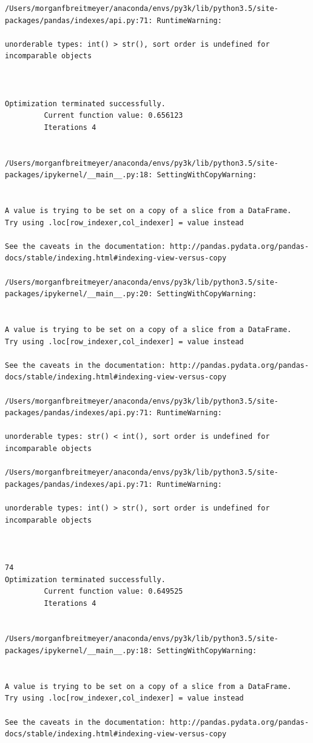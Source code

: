 \begin{lstlisting}
/Users/morganfbreitmeyer/anaconda/envs/py3k/lib/python3.5/site-packages/pandas/indexes/api.py:71: RuntimeWarning:

unorderable types: int() > str(), sort order is undefined for incomparable objects



Optimization terminated successfully.
         Current function value: 0.656123
         Iterations 4


/Users/morganfbreitmeyer/anaconda/envs/py3k/lib/python3.5/site-packages/ipykernel/__main__.py:18: SettingWithCopyWarning:


A value is trying to be set on a copy of a slice from a DataFrame.
Try using .loc[row_indexer,col_indexer] = value instead

See the caveats in the documentation: http://pandas.pydata.org/pandas-docs/stable/indexing.html#indexing-view-versus-copy

/Users/morganfbreitmeyer/anaconda/envs/py3k/lib/python3.5/site-packages/ipykernel/__main__.py:20: SettingWithCopyWarning:


A value is trying to be set on a copy of a slice from a DataFrame.
Try using .loc[row_indexer,col_indexer] = value instead

See the caveats in the documentation: http://pandas.pydata.org/pandas-docs/stable/indexing.html#indexing-view-versus-copy

/Users/morganfbreitmeyer/anaconda/envs/py3k/lib/python3.5/site-packages/pandas/indexes/api.py:71: RuntimeWarning:

unorderable types: str() < int(), sort order is undefined for incomparable objects

/Users/morganfbreitmeyer/anaconda/envs/py3k/lib/python3.5/site-packages/pandas/indexes/api.py:71: RuntimeWarning:

unorderable types: int() > str(), sort order is undefined for incomparable objects



74
Optimization terminated successfully.
         Current function value: 0.649525
         Iterations 4


/Users/morganfbreitmeyer/anaconda/envs/py3k/lib/python3.5/site-packages/ipykernel/__main__.py:18: SettingWithCopyWarning:


A value is trying to be set on a copy of a slice from a DataFrame.
Try using .loc[row_indexer,col_indexer] = value instead

See the caveats in the documentation: http://pandas.pydata.org/pandas-docs/stable/indexing.html#indexing-view-versus-copy


\end{lstlisting}
